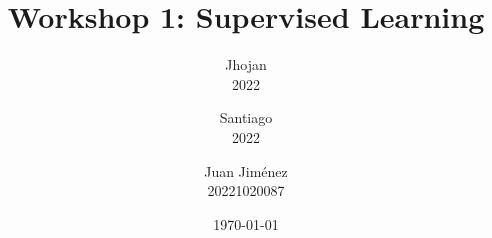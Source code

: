 \documentclass[12pt,a4paper]{article}
\begin{document}
\title{Workshop 1: Supervised Learning}
\author{Jhojan \\ 2022
\and Santiago \\ 2022
\and Juan Jiménez \\ 20221020087}
\date{\today}

\maketitle

\tableofcontents










\printbibliography
\end{document}
